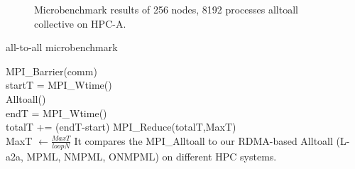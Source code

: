\begin{figure}[!htb]
  \caption{Microbenchmark results of 256 nodes, 8192 processes alltoall collective on HPC-A.}
	\label{HPCA-EXPR}
	\vspace{0.2in}
\end{figure}

\begin{algorithm}
\caption{all-to-all microbenchmark}\label{RDMASa2a}
{
	{
		MPI\_Barrier(comm) \\
		startT = MPI\_Wtime() \\
		Alltoall() \\
		endT = MPI\_Wtime() \\
		totalT += (endT-start)
	}
	MPI\_Reduce(totalT,MaxT) \\
	MaxT $\leftarrow \frac{MaxT}{loopN}$ 
}
It compares the MPI\_Alltoall to our RDMA-based Alltoall (L-a2a, MPML, NMPML, ONMPML) on different HPC systems.
\end{algorithm}
